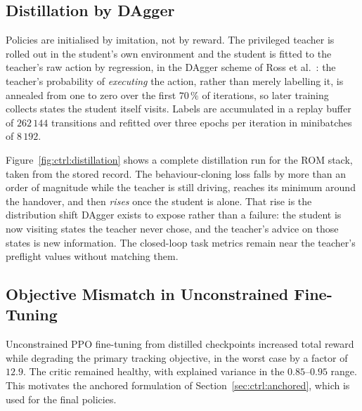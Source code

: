 \subsection{Distillation by DAgger}

Policies are initialised by imitation, not by reward. The privileged teacher is
rolled out in the student's own environment and the student is fitted to the
teacher's raw action by regression, in the DAgger scheme of Ross et
al.~\cite{ross2011reduction}: the teacher's probability of \emph{executing} the
action, rather than merely labelling it, is annealed from one to zero over the
first $70\,\%$ of iterations, so later training collects states the student
itself visits. Labels are accumulated in a replay buffer of $262\,144$
transitions and refitted over three epochs per iteration in minibatches of
$8\,192$.

Figure~\ref{fig:ctrl:distillation} shows a complete distillation run for the
ROM stack, taken from the stored record. The behaviour-cloning loss falls by
more than an order of magnitude while the teacher is still driving, reaches its
minimum around the handover, and then \emph{rises} once the student is alone.
That rise is the distribution shift DAgger exists to expose rather than a
failure: the student is now visiting states the teacher never chose, and the
teacher's advice on those states is new information. The closed-loop task
metrics remain near the teacher's preflight values without matching them.

\subsection{Objective Mismatch in Unconstrained Fine-Tuning}
\label{sec:ctrl:finding}

Unconstrained PPO fine-tuning from distilled checkpoints increased total reward
while degrading the primary tracking objective, in the worst case by a factor
of $12.9$. The critic remained healthy, with explained variance in the
$0.85$--$0.95$ range. This motivates the anchored formulation of
Section~\ref{sec:ctrl:anchored}, which is used for the final policies.

